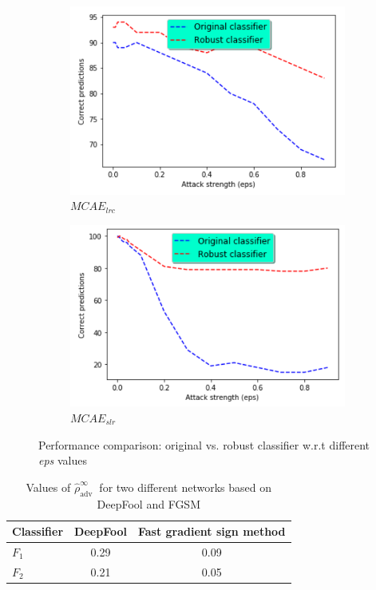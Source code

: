 \begin{figure}[h]
	\centering
	\begin{subfigure}{.48\linewidth}
		\centering
		\includegraphics[scale=1.0]{images/adversarial_training_1.png}
		\caption{$MCAE_{lrc}$}
        \label{fig:normal_vs_robust_f1}
	\end{subfigure}
	\begin{subfigure}{0.48\linewidth}
		\centering
		\includegraphics[scale=1.0]{images/adversarial_training_2.png}
		\caption{$MCAE_{slr}$}
        \label{fig:normal_vs_robust_f2}
	\end{subfigure}
	\caption{Performance comparison: original vs.  robust classifier w.r.t  different \textit{eps} values} 
	\label{fig:normal_vs_robust_models}
\end{figure}

\begin{table}[h]
    \centering
    \caption{Values of $\hat{\rho}_{\text {adv }}^{\infty}$ for two different networks based on DeepFool and FGSM}
    \begin{tabular}{l|c|c}
        \hline \textbf{Classifier} & \textbf{DeepFool} & \textbf{Fast gradient sign method} \\ \hline $F_1$ & 0.29 & 0.09 \\ \hline 
        $F_2$ & 0.21 & 0.05 \\
        \hline
    \end{tabular}
    \label{tab:robustness_result}
\end{table}


